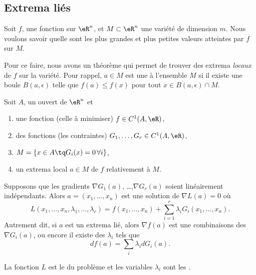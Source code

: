 \subsection{Extrema liés}

Soit $f$, une fonction sur $\eR^n$, et $M\subset \eR^n$ une variété de dimension $m$. Nous voulons savoir quelle sont les plus grandes et plus petites valeurs atteintes par $f$ sur $M$.

Pour ce faire, nous avons un théorème qui permet de trouver des extrema \emph{locaux} de $f$ sur la variété. Pour rappel, $a\in M$ est une  à l'ensemble $M$ si il existe une boule $B(a,\epsilon)$ telle que $f(a)\leq f(x)$ pour tout $x\in B(a,\epsilon)\cap M$.

\begin{theorem} \label{ThoRGJosS}
	Soit \( A\), un ouvert de \( \eR^n\) et
	\begin{enumerate}
		\item
			une fonction (celle à minimiser) $f\in C^1(A,\eR)$,
		\item 
			des fonctions (les contraintes) $G_1,\ldots,G_r\in C^1(A,\eR)$,
		\item
			$M=\{ x\in A\tq G_i(x)=0\,\forall i\}$,
		\item
			un extrema local $a\in M$ de $f$ relativement à $M$.
	\end{enumerate}
	Supposons que les gradients $\nabla G_1(a)$, \ldots,$\nabla G_r(a)$ soient linéairement indépendants. Alors $a=(x_1,\ldots,x_n)$ est une solution de \( \nabla L(a)=0\) où
	\begin{equation}
		L(x_1,\ldots,x_n,\lambda_1,\ldots,\lambda_r)=f(x_1,\ldots,x_n)+\sum_{i=1}^r\lambda_iG_i(x_1,\ldots,x_n).
	\end{equation}
    Autrement dit, si \( a\) est un extrema lié, alors \( \nabla f(a)\) est une combinaisons des \( \nabla G_i(a)\), ou encore il existe des \( \lambda_i\) tels que
    \begin{equation}    \label{EqRDsSXyZ}
        df(a)=\sum_i\lambda_idG_i(a).
    \end{equation}
\end{theorem}
La fonction $L$ est le  du problème et les variables \( \lambda_i\) sont les .

